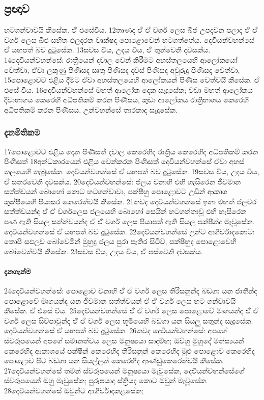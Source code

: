 \documentclass[10pt]{book}
\begin{document}
\subsection{ප්‍රඥාව}
හටගන්වාවයි කීසේක. ඒ එසේවිය. 12තෘණද ඒ ඒ වර්ග ලෙස බීජ උපදවන පලාද ඒ ඒ වර්ග ලෙස බීජ සහිත ඵලදරන වෘක්ෂද පොළොවෙන් හටගත්තේය. දෙවියන්වහන්සේ ඒ යහපත් බව දුටුසේක. 13සවස විය, උදය විය, ඒ තුන්වෙනි දවසක්ය. 14දෙවියන්වහන්සේ: රාත්‍රියෙන් දවාල වෙන් කිරීමට අහස්තලයෙහි ආලෝකයෝ වෙත්වා, ඒවා ලකුණු පිණිසද සෘතු පිණිසද දවස් පිණිසද අවුරුදු පිණිසද වෙත්වා, 15පොළොවට එළිය දීමට ඒවා අහස්තලයෙහි ආලෝකයන් පිණිස වෙත්වයි කීසේක. ඒ එසේ විය. 16දෙවියන්වහන්සේ මහත් ආලෝක දෙක සෑදූසේක; වඩා මහත් ආලෝකය දිවාභාගය කෙරෙහි අධිපතිකම් කරන පිණිසය, කුඩා ආලෝකය රාත්‍රිභාගය කෙරෙහි අධිපතිකම් කරන පිණිසය. උන්වහන්සේ තාරකාද සෑදූසේක.

\subsubsection{දැනමිතිකම}
 17පොළොවට එළිය දෙන පිණිසත් දවාල කෙරෙහිද රාත්‍රිය කෙරෙහිද අධිපතිකම් කරන පිණිසත් 18අන්ධකාරයෙන් එළිය වෙන්කරන පිණිසත් දෙවියන්වහන්සේ ඒවා අහස් තලයෙහි තැබූසේක. දෙවියන්වහන්සේ ඒ යහපත් බව දුටුසේක. 19සවස විය, උදය විය, ඒ සතරවෙනි දවසක්ය. 20දෙවියන්වහන්සේ: ජලය වනාහි එහි හැසිරෙන ජීවමාන සත්ත්වයන් බොහෝ කොට හටගන්වාවා, පක්ෂීහු පොළොවට උඩින් ආකාශ කුක්ෂීයෙහි පියාසර කෙරෙත්වයි කීසේක. 21තවද දෙවියන්වහන්සේ ඉතා මහත් ජලචර සත්ත්වයන්ද ඒ ඒ වර්ගලෙස ජලයෙහි බොහෝ සෙයින් හටගත්තාවූ එහි හැසිරෙන පණ ඇති සියලු සත්ත්වයන්ද ඒ ඒ වර්ග ලෙස පියාපත් ඇති සියලු පක්ෂීන්ද මැවූසේක. දෙවියන්වහන්සේ ඒ යහපත් බව දුටුසේක. 22දෙවියන්වහන්සේ උන්ට ආශීර්වාදකොට: තොපි සඵලව බෝවෙමින් මුහුදු ජලය පුරා පැතිර සිටිව්, පක්ෂීහුද පොළොවෙහි බෝවෙත්වයි කීසේක. 23සවස විය, උදය විය, ඒ පස්වෙනි දවසක්ය.
 
\paragraph{දැනගැන්ම} 
  24දෙවියන්වහන්සේ: පොළොව වනාහි ඒ ඒ වර්ග ලෙස තිරිසනුන්ද බඩගා යන ජාතීන්ද පොළොවේ මෘගයන්ද යන ජීවමාන සත්ත්වයන් ඒ ඒ වර්ග ලෙස හට ගන්වාවයි කීසේක. ඒ එසේ විය. 25දෙවියන්වහන්සේ ඒ ඒ වර්ග ලෙස පොළොවේ මෘගයන්ද ඒ ඒ වර්ග ලෙස සිව්පාවුන්ද ඒ ඒ වර්ග ලෙස භූමියෙහි බඩගා යන සියලු සතුන්ද සෑදූසේක. \\


 
දෙවියන්වහන්සේ ඒ යහපත් බව දුටුසේක. 26තවද දෙවියන්වහන්සේ: අපගේ ස්වරූපයෙන් අපගේ සමානත්වය ලෙස මනුෂ්‍යයා සාදම්හ; ඔව්හු මුහුදේ මත්ස්‍යයන් කෙරෙහිද ආකාශයේ පක්ෂීන් කෙරෙහිද තිරිසනුන් කෙරෙහිද මුළු පොළොව කෙරෙහිද පොළොව පිට බඩගා යන සියල්ලන් කෙරෙහිද ආණ්ඩුකෙරෙත්වයි කීසේක. 27දෙවියන්වහන්සේ තමන් ස්වරූපයෙන් මනුෂ්‍යයා මැවුසේක, දෙවියන්වහන්සේගේ ස්වරූපයෙන් ඔහු මැවුසේක; පුරුෂයාද ස්ත්‍රියද කොට ඔවුන් මැවූසේක. 28දෙවියන්වහන්සේ ඔවුන්ට ආශීර්වාදකළසේක;
\end{document}
